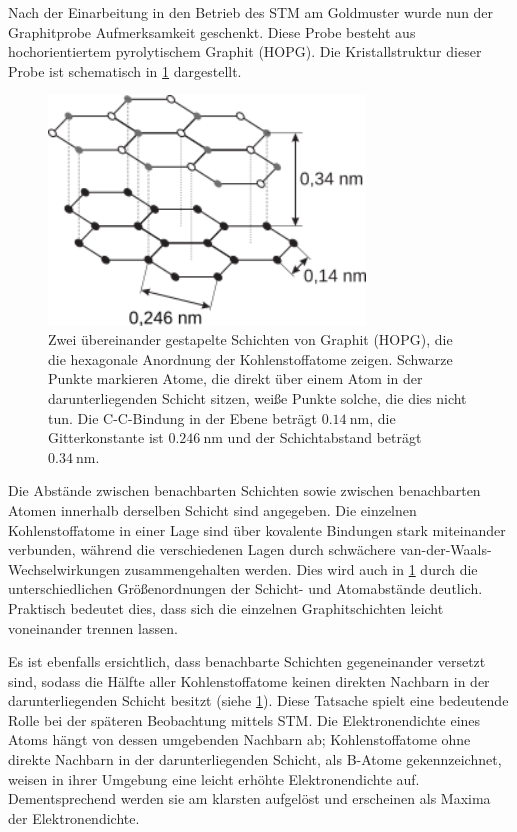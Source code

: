 Nach der Einarbeitung in den Betrieb des STM am Goldmuster wurde nun der Graphitprobe Aufmerksamkeit geschenkt. Diese Probe besteht aus hochorientiertem pyrolytischem Graphit (HOPG). Die Kristallstruktur dieser Probe ist schematisch in \cref{fig:HOPG_struktur} dargestellt. 
\begin{figure}[H]
    \centering
    \includegraphics[width=0.75\textwidth]{figs/Hpg_struktur.png}
    \caption{Zwei übereinander gestapelte Schichten von Graphit (HOPG), die die hexagonale Anordnung der Kohlenstoffatome zeigen. Schwarze Punkte markieren Atome, die direkt über einem Atom in der darunterliegenden Schicht sitzen, weiße Punkte solche, die dies nicht tun. 
    Die C-C-Bindung in der Ebene beträgt $\SI{0.14}{\nano\metre}$, die Gitterkonstante ist $\SI{0.246}{\nano\metre}$ und der Schichtabstand beträgt $\SI{0.34}{\nano\metre}$.  \cite{praktikum}}
    \label{fig:HOPG_struktur}
\end{figure} 

Die Abstände zwischen benachbarten Schichten sowie zwischen benachbarten Atomen innerhalb derselben Schicht sind angegeben. Die einzelnen Kohlenstoffatome in einer Lage sind über kovalente Bindungen stark miteinander verbunden, während die verschiedenen Lagen durch schwächere van-der-Waals-Wechselwirkungen zusammengehalten werden. 
Dies wird auch in \cref{fig:HOPG_struktur} durch die unterschiedlichen Größenordnungen der Schicht- und Atomabstände deutlich. Praktisch bedeutet dies, dass sich die einzelnen Graphitschichten leicht voneinander trennen lassen.


Es ist ebenfalls ersichtlich, dass benachbarte Schichten gegeneinander versetzt sind, sodass die Hälfte aller Kohlenstoffatome keinen direkten Nachbarn in der darunterliegenden Schicht besitzt (siehe \cref{fig:HOPG_struktur}). Diese Tatsache spielt eine bedeutende Rolle bei der späteren Beobachtung mittels STM.
Die Elektronendichte eines Atoms hängt von dessen umgebenden Nachbarn ab; Kohlenstoffatome ohne direkte Nachbarn in der darunterliegenden Schicht, als B-Atome gekennzeichnet, weisen in ihrer Umgebung eine leicht erhöhte Elektronendichte auf. 
Dementsprechend werden sie am klarsten aufgelöst und erscheinen als Maxima der Elektronendichte. 

